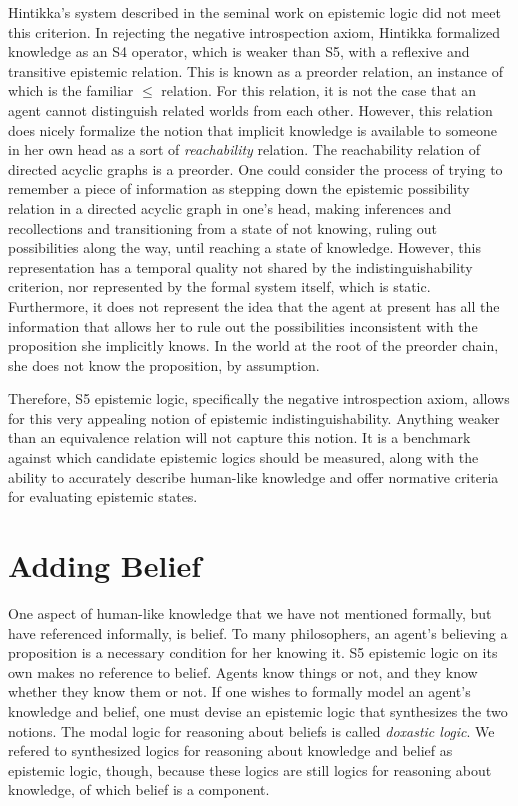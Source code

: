 Hintikka's system described in the seminal work on epistemic logic did not meet this criterion. In rejecting the negative introspection axiom, Hintikka formalized knowledge as an S4 operator, which is weaker than S5, with a reflexive and transitive epistemic relation. This is known as a preorder relation, an instance of which is the familiar $\leq$ relation. For this relation, it is not the case that an agent cannot distinguish related worlds from each other. However, this relation does nicely formalize the notion that implicit knowledge is available to someone in her own head as a sort of \emph{reachability} relation. The reachability relation of directed acyclic graphs is a preorder. One could consider the process of trying to remember a piece of information as stepping down the epistemic possibility relation in a directed acyclic graph in one's head, making inferences and recollections and transitioning from a state of not knowing, ruling out possibilities along the way, until reaching a state of knowledge. However, this representation has a temporal quality not shared by the indistinguishability criterion, nor represented by the formal system itself, which is static. Furthermore, it does not represent the idea that the agent at present has all the information that allows her to rule out the possibilities inconsistent with the proposition she implicitly knows. In the world at the root of the preorder chain, she does not know the proposition, by assumption.

Therefore, S5 epistemic logic, specifically the negative introspection axiom, allows for this very appealing notion of epistemic indistinguishability. Anything weaker than an equivalence relation will not capture this notion. It is a benchmark against which candidate epistemic logics should be measured, along with the ability to accurately describe human-like knowledge and offer normative criteria for evaluating epistemic states.

\section{Adding Belief}
\label{sec:belief}
One aspect of human-like knowledge that we have not mentioned formally, but have referenced informally, is belief. To many philosophers, an agent's believing a proposition is a necessary condition for her knowing it. S5 epistemic logic on its own makes no reference to belief. Agents know things or not, and they know whether they know them or not. If one wishes to formally model an agent's knowledge and belief, one must devise an epistemic logic that synthesizes the two notions. The modal logic for reasoning about beliefs is called \emph{doxastic logic}. We refered to synthesized logics for reasoning about knowledge and belief as epistemic logic, though, because these logics are still logics for reasoning about knowledge, of which belief is a component.

